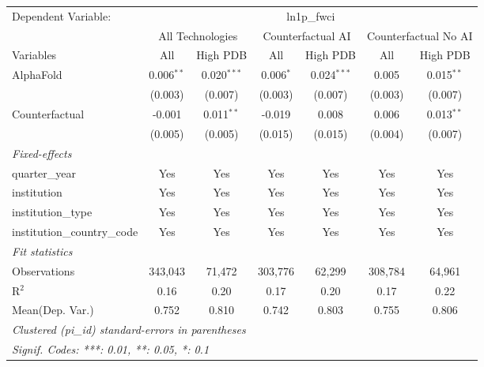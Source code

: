 \begingroup
\centering
\begin{tabular}{lcccccc}
   \tabularnewline \midrule \midrule
   Dependent Variable: & \multicolumn{6}{c}{ln1p\_fwci}\\
 & \multicolumn{2}{c}{All Technologies} & \multicolumn{2}{c}{Counterfactual AI} & \multicolumn{2}{c}{Counterfactual No AI} \\
\cmidrule(lr){1-1}\cmidrule(lr){2-3} \cmidrule(lr){4-5} \cmidrule(lr){6-7}
Variables & \multicolumn{1}{c}{All} & \multicolumn{1}{c}{High PDB} & \multicolumn{1}{c}{All} & \multicolumn{1}{c}{High PDB} & \multicolumn{1}{c}{All} & \multicolumn{1}{c}{High PDB} \\
\cmidrule(lr){1-1}\cmidrule(lr){2-2} \cmidrule(lr){3-3} \cmidrule(lr){4-4} \cmidrule(lr){5-5} \cmidrule(lr){6-6} \cmidrule(lr){7-7}
   AlphaFold                    & 0.006$^{**}$ & 0.020$^{***}$ & 0.006$^{*}$ & 0.024$^{***}$ & 0.005   & 0.015$^{**}$\\   
                                & (0.003)      & (0.007)       & (0.003)     & (0.007)       & (0.003) & (0.007)\\   
   Counterfactual               & -0.001       & 0.011$^{**}$  & -0.019      & 0.008         & 0.006   & 0.013$^{**}$\\   
                                & (0.005)      & (0.005)       & (0.015)     & (0.015)       & (0.004) & (0.007)\\   
   \midrule
   \emph{Fixed-effects}\\
   quarter\_year                & Yes          & Yes           & Yes         & Yes           & Yes     & Yes\\  
   institution                  & Yes          & Yes           & Yes         & Yes           & Yes     & Yes\\  
   institution\_type            & Yes          & Yes           & Yes         & Yes           & Yes     & Yes\\  
   institution\_country\_code   & Yes          & Yes           & Yes         & Yes           & Yes     & Yes\\  
   \midrule
   \emph{Fit statistics}\\
   Observations                 & 343,043      & 71,472        & 303,776     & 62,299        & 308,784 & 64,961\\  
   R$^2$                        & 0.16         & 0.20          & 0.17        & 0.20          & 0.17    & 0.22\\  
Mean(Dep. Var.) & 0.752 & 0.810 & 0.742 & 0.803 & 0.755 & 0.806 \\
   \midrule \midrule
   \multicolumn{7}{l}{\emph{Clustered (pi\_id) standard-errors in parentheses}}\\
   \multicolumn{7}{l}{\emph{Signif. Codes: ***: 0.01, **: 0.05, *: 0.1}}\\
\end{tabular}
\par\endgroup
